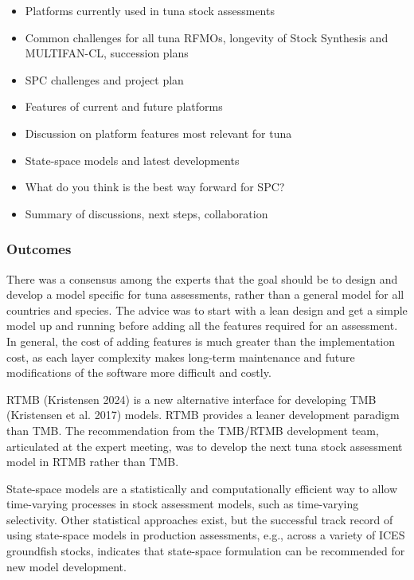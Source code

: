 \documentclass{SCreport}
\begin{document}
\begin{itemize}
  \item Platforms currently used in tuna stock assessments\\[-4ex]
  \item Common challenges for all tuna RFMOs, longevity of Stock Synthesis and
  MULTIFAN-CL, succession plans\\[-4ex]
  \item SPC challenges and project plan\\[-4ex]
  \item Features of current and future platforms\\[-4ex]
  \item Discussion on platform features most relevant for tuna\\[-4ex]
  \item State-space models and latest developments\\[-4ex]
  \item What do you think is the best way forward for SPC?\\[-4ex]
  \item Summary of discussions, next steps, collaboration
\end{itemize}

\subsubsection{Outcomes}

There was a consensus among the experts that the goal should be to design and
develop a model specific for tuna assessments, rather than a general model for
all countries and species. The advice was to start with a lean design and get a
simple model up and running before adding all the features required for an
assessment. In general, the cost of adding features is much greater than the
implementation cost, as each layer complexity makes long-term maintenance and
future modifications of the software more difficult and costly.

RTMB (Kristensen 2024) is a new alternative interface for developing TMB
(Kristensen et al. 2017) models. RTMB provides a leaner development paradigm
than TMB. The recommendation from the TMB/RTMB development team, articulated at
the expert meeting, was to develop the next tuna stock assessment model in RTMB
rather than TMB.

State-space models are a statistically and computationally efficient way to
allow time-varying processes in stock assessment models, such as time-varying
selectivity. Other statistical approaches exist, but the successful track record
of using state-space models in production assessments, e.g., across a variety of
ICES groundfish stocks, indicates that state-space formulation can be
recommended for new model development.
\end{document}
